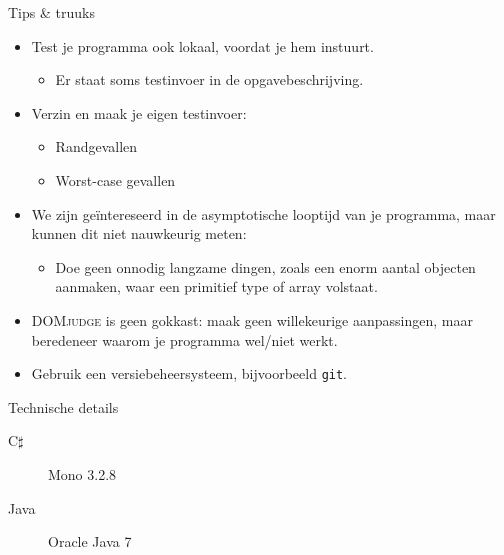 \documentclass[serif,professionalfont]{beamer}
\newcommand{\DOMjudge}{\textsc{DOMjudge}\xspace}
\begin{document}
\begin{frame}{Tips \& truuks}

    \begin{itemize}
    
        \item Test je programma ook lokaal, voordat je hem instuurt.
        
            \begin{itemize}
            
                \item Er staat soms testinvoer in de opgavebeschrijving.
                
            \end{itemize}
        
        \item Verzin en maak je eigen testinvoer:
        
            \begin{itemize}
            
                \item Randgevallen
                
                \item Worst-case gevallen
            
            \end{itemize}
        
        \item We zijn ge\"intereseerd in de asymptotische looptijd van je programma, maar kunnen dit niet nauwkeurig meten:
        
            \begin{itemize}
            
                \item Doe geen onnodig langzame dingen, zoals een enorm aantal objecten aanmaken, waar een primitief type of array volstaat.
            
            \end{itemize}

        \item \DOMjudge is geen gokkast: maak geen willekeurige aanpassingen, maar beredeneer waarom je programma wel/niet werkt.

        \item Gebruik een versiebeheersysteem, bijvoorbeeld \texttt{git}.
    
    \end{itemize}

\end{frame}

\begin{frame}{Technische details}

    \begin{description}
    
        \item[C$\sharp$] Mono 3.2.8
        
        \item[Java] Oracle Java 7
    
    \end{description}

\end{frame}
\end{document}
